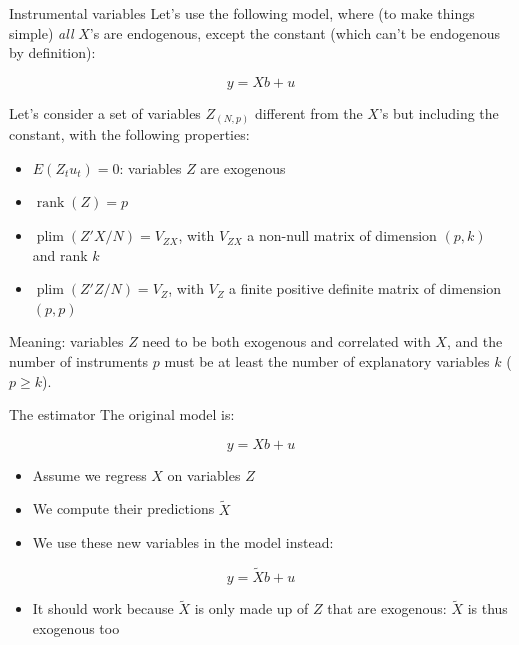 \documentclass[aspectratio=169]{beamer}
\DeclareMathOperator{\plim}{plim}
\begin{document}
\begin{frame}{Instrumental variables}
Let's use the following model, where (to make things simple) \emph{all} $X$'s are endogenous, except the constant (which can't be endogenous by definition):

\[y = Xb + u\]

Let's consider a set of variables $Z_{(N,p)}$ different from the $X$'s but including the constant, with the following properties:
\begin{itemize}
    \item $E(Z_tu_t) = 0$: variables $Z$ are exogenous
    \item $\operatorname{rank}(Z) = p$
    \item $\plim(Z'X/N) = V_{ZX}$, with $V_{ZX}$ a non-null matrix of dimension $(p,k)$ and rank $k$
    \item $\plim(Z'Z/N) = V_Z$, with $V_Z$ a finite positive definite matrix of dimension $(p,p)$
\end{itemize}

Meaning: variables $Z$ need to be both exogenous and correlated with $X$, and the number of instruments $p$ must be at least the number of explanatory variables $k$ ($p \geq k$).
\end{frame}

\begin{frame}{The estimator}
The original model is:

\[y = Xb + u\]

\begin{itemize}
    \item Assume we regress $X$ on variables $Z$
    \item We compute their predictions $\tilde{X}$
    \item We use these new variables in the model instead:
\end{itemize}

\[y = \tilde{X}b + u\]

\begin{itemize}
    \item It should work because $\tilde{X}$ is only made up of $Z$ that are exogenous: $\tilde{X}$ is thus exogenous too
\end{itemize}
\end{frame}
\end{document}
